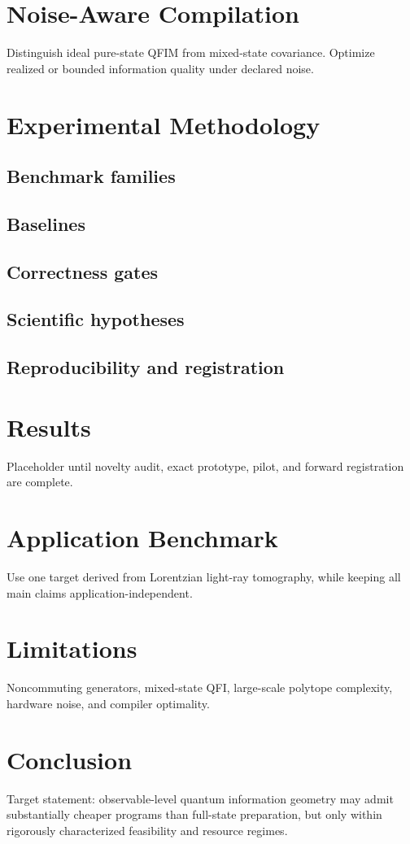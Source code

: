\documentclass[11pt]{article}
\begin{document}
\section{Noise-Aware Compilation}
Distinguish ideal pure-state QFIM from mixed-state covariance. Optimize realized or bounded information quality under declared noise.

\section{Experimental Methodology}
\subsection{Benchmark families}
\subsection{Baselines}
\subsection{Correctness gates}
\subsection{Scientific hypotheses}
\subsection{Reproducibility and registration}

\section{Results}
Placeholder until novelty audit, exact prototype, pilot, and forward registration are complete.

\section{Application Benchmark}
Use one target derived from Lorentzian light-ray tomography, while keeping all main claims application-independent.

\section{Limitations}
Noncommuting generators, mixed-state QFI, large-scale polytope complexity, hardware noise, and compiler optimality.

\section{Conclusion}
Target statement: observable-level quantum information geometry may admit substantially cheaper programs than full-state preparation, but only within rigorously characterized feasibility and resource regimes.
\end{document}
